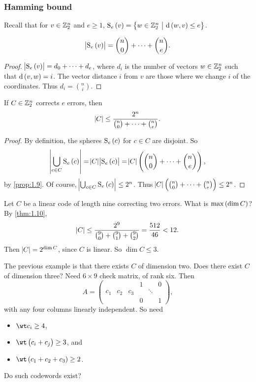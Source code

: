 \subsubsection{Hamming bound}

Recall that for $ v \in \mathbb{Z}_2^n $ and $ e \ge 1 $, $ \S_e\br{v} = \cbr{w \in \ZZ_2^n \st \d\br{w, v} \le e} $.

\begin{proposition}
\label{prop:1.9}
$$ \abs{\S_e\br{v}} = \binom{n}{0} + \dots + \binom{n}{e}. $$
\end{proposition}

\begin{proof}
$ \abs{\S_e\br{v}} = d_0 + \dots + d_e $, where $ d_i $ is the number of vectors $ w \in \mathbb{Z}_2^n $ such that $ \d\br{v, w} = i $. The vector distance $ i $ from $ v $ are those where we change $ i $ of the coordinates. Thus $ d_i = \binom{n}{i} $.
\end{proof}

\begin{theorem}
\label{thm:1.10}
If $ C \in \mathbb{Z}_2^n $ corrects $ e $ errors, then
$$ \abs{C} \le \dfrac{2^n}{\binom{n}{0} + \dots + \binom{n}{e}}. $$
\end{theorem}


\begin{proof}
By definition, the spheres $ \S_e\br{c} $ for $ c \in C $ are disjoint. So
$$ \abs{\bigcup_{c \in C} \S_e\br{c}} = \abs{C}\abs{\S_e\br{c}} = \abs{C}\br{\binom{n}{0} + \dots + \binom{n}{e}}, $$
by \ref{prop:1.9}. Of course, $ \abs{\bigcup_{c \in C} \S_e\br{c}} \le 2^n $. Thus $ \abs{C}\br{\binom{n}{0} + \dots + \binom{n}{e}} \le 2^n $.
\end{proof}

\begin{example*}
Let $ C $ be a linear code of length nine correcting two errors. What is $ \max\br{\dim C} $? By \ref{thm:1.10},
$$ \abs{C} \le \dfrac{2^9}{\binom{9}{0} + \binom{9}{1} + \binom{9}{2}} = \dfrac{512}{46} < 12. $$
Then $ \abs{C} = 2^{\dim C} $, since $ C $ is linear. So $ \dim C \le 3 $.
\end{example*}

\pagebreak

The previous example is that there exists $ C $ of dimension two. Does there exist $ C $ of dimension three? Need $ 6 \times 9 $ check matrix, of rank six. Then
$$ A =
\begin{pmatrix}
& & & 1 & & 0 \\
c_1 & c_2 & c_3 & & \ddots & \\
& & & 0 & & 1
\end{pmatrix},
$$
with any four columns linearly independent. So need
\begin{itemize}
\item $ \wt c_i \ge 4 $,
\item $ \wt \br{c_i + c_j} \ge 3 $, and
\item $ \wt \br{c_1 + c_2 + c_3} \ge 2 $.
\end{itemize}
Do such codewords exist?

